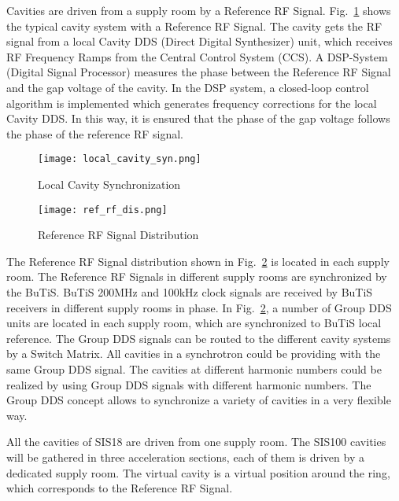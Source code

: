 Cavities are driven from a supply room by a Reference RF Signal. Fig.~\ref{local_cavity_syn} shows the typical cavity system with a Reference RF Signal. The cavity gets the RF signal from a local Cavity DDS (Direct Digital Synthesizer) unit, which receives RF Frequency Ramps from the Central Control System (CCS). A DSP-System (Digital Signal Processor) measures the phase between the Reference RF Signal and the gap voltage of the cavity. In the DSP system, a closed-loop control algorithm is implemented which generates frequency corrections for the local Cavity DDS. In this way, it is ensured that the phase of the gap voltage follows the phase of the reference RF signal. 
\begin{figure}[!htb]
   \centering   
   \texttt{[image: local\_cavity\_syn.png]}
   \caption{Local Cavity Synchronization}
   \label{local_cavity_syn}
\end{figure}
\begin{figure}[!htb]
   \centering   
   \texttt{[image: ref\_rf\_dis.png]}
   \caption{Reference RF Signal Distribution}
   \label{ref_rf_dis}
\end{figure}
The Reference RF Signal distribution shown in Fig.~\ref{ref_rf_dis} is located in each supply room. The Reference RF Signals in different supply rooms are synchronized by the BuTiS. BuTiS 200MHz and 100kHz clock signals are received by BuTiS receivers in different supply rooms in phase. In Fig.~\ref{ref_rf_dis}, a number of Group DDS units are located in each supply room, which are synchronized to BuTiS local reference. The Group DDS signals can be routed to the different cavity systems by a Switch Matrix. All cavities in a synchrotron could be providing with the same Group DDS signal. The cavities at different harmonic numbers could be realized by using Group DDS signals with different harmonic numbers. The Group DDS concept allows to synchronize a variety of cavities in a very flexible way. 

All the cavities of SIS18 are driven from one supply room. The SIS100 cavities will be gathered in three acceleration sections, each of them is driven by a dedicated supply room. 
The virtual cavity is a virtual position around the ring, which corresponds to the Reference RF Signal. 


